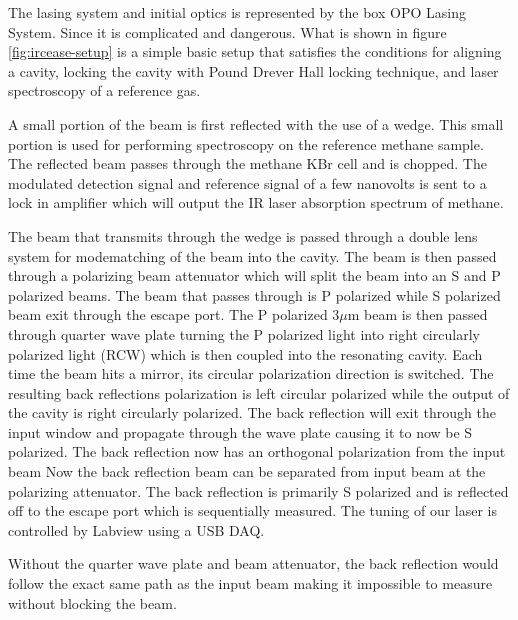 \documentclass[11pt,a4paper]{book}
\newcommand{\imginput}[1]{} %
\begin{document}
		The lasing system and initial optics is represented by the box OPO Lasing System. Since it is complicated and dangerous. What is shown in figure \autoref{fig:ircease-setup} is a simple basic setup that satisfies the conditions for aligning a cavity, locking the cavity with Pound Drever Hall locking technique, and laser spectroscopy of a reference gas.
		
		A small portion of the beam is first reflected with the use of a wedge. This small portion is used for performing spectroscopy on the reference methane sample. The reflected beam passes through the methane KBr cell and is chopped. The modulated detection signal and reference signal of a few nanovolts is sent to a lock in amplifier which will output the IR laser absorption spectrum of methane.
		
		\begin{figure} [!ht]
			\centering
			\resizebox{160mm}{!}{\imginput{images/ircease-setup.pdf_tex}}
			\caption{}
			\label{fig:ircease-setup}
		\end{figure}
		
		The beam that transmits through the wedge is passed through a double lens system for modematching of the beam into the cavity. The beam is then passed through a polarizing beam attenuator which will split the beam into an S and P polarized beams. The beam that passes through is P polarized while S polarized beam exit through the escape port. The P polarized 3$\mu$m beam is then passed  through quarter wave plate turning the P polarized light into  right circularly polarized light (RCW) which is then coupled into the resonating cavity. Each time the beam hits a mirror, its circular polarization direction is switched. The resulting back reflections polarization is left circular polarized while the output of the cavity is right circularly polarized. The back reflection will exit through the input window and propagate through the wave plate causing it to now be S polarized. The back reflection now has an orthogonal polarization from the input beam Now the back reflection beam can be separated from input beam at the polarizing attenuator. The back reflection is primarily S polarized and is reflected off to the escape port which is sequentially measured.
		The tuning of our laser is controlled by Labview using a USB DAQ.
		
		Without the quarter wave plate and beam attenuator, the back reflection would follow the exact same path as the input beam making it impossible to measure without blocking the beam.
		
\end{document}
